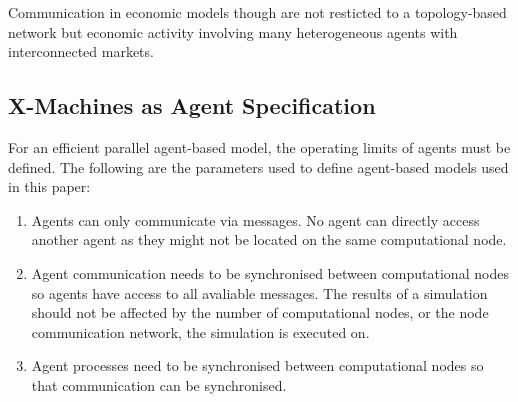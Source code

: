 \documentclass{aamas2009}
\begin{document}
Communication in economic models though are not resticted to
a topology-based network but economic activity involving many
heterogeneous agents with interconnected markets.


\subsection{X-Machines as Agent Specification}

For an efficient parallel agent-based model, the operating limits of agents
must be defined.
The following are the parameters used to define agent-based models used in this
paper:


\begin{enumerate}
  \item Agents can only communicate via messages. No agent can directly access
  another agent as they might not be located on the same computational node.
  \item Agent communication needs to be synchronised between computational nodes
  so agents have access to all avaliable messages. The results of a simulation
  should not be affected by the number of
computational nodes, or the node communication network, the simulation is
executed on.
  \item Agent processes need to be synchronised between computational nodes so
  that communication can be synchronised.
\end{enumerate}



\end{document}
